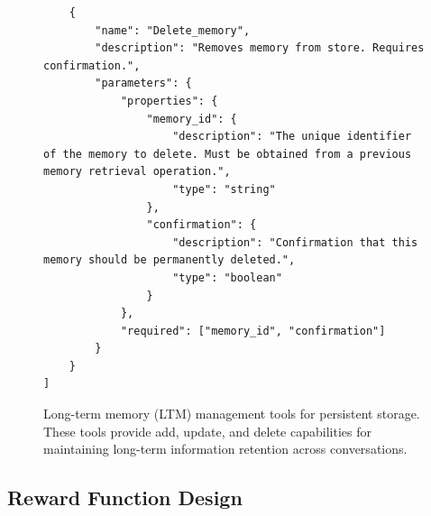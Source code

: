 \begin{figure}[p]
\begin{tcolorbox}
\begin{lstlisting}
    {
        "name": "Delete_memory",
        "description": "Removes memory from store. Requires confirmation.",
        "parameters": {
            "properties": {
                "memory_id": {
                    "description": "The unique identifier of the memory to delete. Must be obtained from a previous memory retrieval operation.",
                    "type": "string"
                },
                "confirmation": {
                    "description": "Confirmation that this memory should be permanently deleted.",
                    "type": "boolean"
                }
            },
            "required": ["memory_id", "confirmation"]
        }
    }
]
\end{lstlisting}
\end{tcolorbox}
\caption{Long-term memory (LTM) management tools for persistent storage. These tools provide add, update, and delete capabilities for maintaining long-term information retention across conversations.}
\label{fig:ltm_tool_schemas}
\end{figure}


\subsection{Reward Function Design}
\label{app:rewards}

